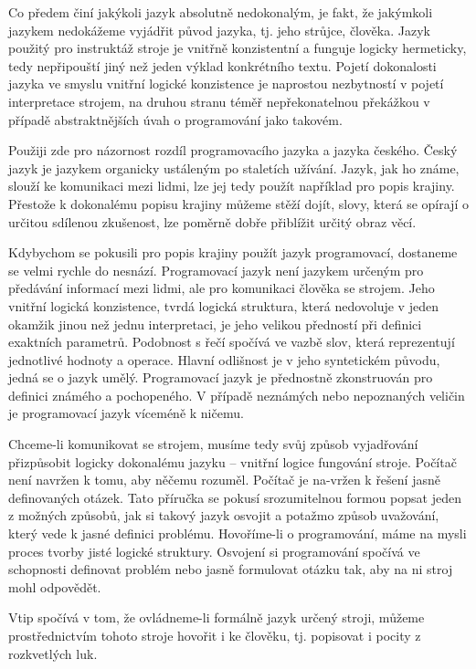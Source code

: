\documentclass[10pt,twoside=true,open=right,cleardoublepage=empty,chapterprefix=true]{scrbook}
\newcommand{\lnb}{\linebreak}
\begin{document}
Co předem činí jakýkoli jazyk absolutně nedokonalým, je fakt, že jakýmkoli jazykem nedokážeme vyjádřit původ jazyka, tj. jeho strůjce, člověka. Jazyk použitý pro instruktáž stroje je vnitřně konzistentní a funguje logicky hermeticky, tedy nepřipouští jiný než jeden výklad konkrétního textu. Pojetí dokonalosti jazyka ve smyslu vnitřní logické konzistence je naprostou nezbytností v pojetí interpretace strojem, na druhou stranu téměř nepřekonatelnou překážkou v případě abstraktnějších úvah o programování jako takovém.

Použiji zde pro názornost rozdíl programovacího jazyka a jazyka českého. Český jazyk je jazykem organicky ustáleným po staletích užívání. Jazyk, jak ho známe, slouží ke komunikaci mezi lidmi, lze jej tedy použít například pro popis krajiny. Přestože k dokonalému popisu krajiny můžeme stěží dojít, slovy, která se opírají o určitou sdílenou zkušenost, lze poměrně dobře přiblížit určitý obraz věcí.

Kdybychom se pokusili pro popis krajiny použít jazyk programovací, dostaneme se velmi rychle do nesnází. Programovací jazyk není jazykem určeným pro předávání informací mezi lidmi, ale pro komunikaci člověka se strojem. Jeho vnitřní logická konzistence, tvrdá logická struktura, která nedovoluje v jeden okamžik jinou než jednu interpretaci, je jeho velikou předností při definici exaktních parametrů. Podobnost s řečí spočívá ve vazbě slov, která reprezentují jednotlivé hodnoty a operace. Hlavní odlišnost je v jeho syntetickém původu, jedná se o jazyk umělý. Programovací jazyk je přednostně zkonstruován pro definici známého a pochopeného. \lnb V případě neznámých nebo nepoznaných veličin je programovací jazyk víceméně k ničemu. 

Chceme-li komunikovat se strojem, musíme tedy svůj způsob vyjadřování přizpůsobit logicky dokonalému jazyku -- vnitřní logice fungování stroje. Počítač není navržen k tomu, aby něčemu rozuměl. Počítač je na-vržen k řešení jasně definovaných otázek. Tato příručka se pokusí srozumitelnou formou popsat jeden z možných způsobů, jak si takový jazyk osvojit a potažmo způsob uvažování, který vede k jasné definici problému. Hovoříme-li o programování, máme na mysli proces tvorby jisté logické struktury. Osvojení si programování spočívá ve schopnosti definovat problém nebo jasně formulovat otázku tak, aby na ni stroj mohl odpovědět.

Vtip spočívá v tom, že ovládneme-li formálně jazyk určený stroji, můžeme prostřednictvím tohoto stroje hovořit i ke člověku, tj. popisovat i pocity z rozkvetlých luk.
\end{document}
